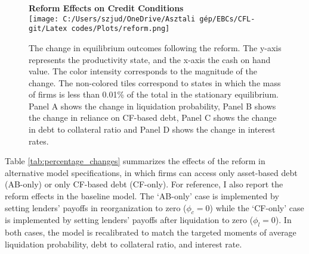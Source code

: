 \documentclass[12pt]{article}
\begin{document}
\begin{figure}[H]
    \centering  
    \textbf{\large Reform Effects on Credit Conditions \vspace{2mm}} \\  %
    \vspace{2mm}  %
    \texttt{[image: C:/Users/szjud/OneDrive/Asztali gép/EBCs/CFL-git/Latex codes/Plots/reform.png]}
    \caption{\small The change in equilibrium outcomes following the reform. The y-axis represents the productivity state, and the x-axis the cash on hand value. The color intensity corresponds to the magnitude of the change. The non-colored tiles correspond to states in which the mass of firms is less than 0.01\% of the total in the stationary equilibrium. Panel A shows the change in liquidation probability, Panel B shows the change in reliance on CF-based debt, Panel C shows the change in debt to collateral ratio and Panel D shows the change in interest rates. }
    \label{chart:poleffects}
\end{figure}

\noindent 
Table \ref{tab:percentage_changes} summarizes the effects of the reform in alternative model specifications, in which firms can access only asset-based debt (AB-only) or only CF-based debt (CF-only). For reference, I also report the reform effects in the baseline model. The `AB-only' case is implemented by setting lenders' payoffs in reorganization to zero ($\phi_c = 0$) while the `CF-only' case is implemented by setting lenders' payoffs after liquidation to zero ($\phi_l = 0$). In both cases, the model is recalibrated to match the targeted moments of average liquidation probability, debt to collateral ratio, and interest rate. 
\end{document}
